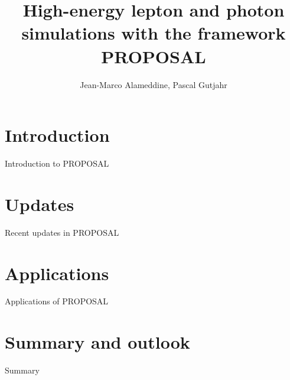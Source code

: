 \documentclass[aspectratio=1610, 9pt]{beamer}
\title{High-energy lepton and photon simulations with the framework PROPOSAL}
\author[jean-marco.alameddine@tu-dortmund.de]{Jean-Marco Alameddine, Pascal Gutjahr}
\institute[]{Astroparticle Physics WG Rhode - TU Dortmund University}
\date[]{}
\begin{document}

\maketitle

\section{Introduction}

\begin{frame}
  \begin{center}
    \Huge Introduction to PROPOSAL
  \end{center}
\end{frame}



\section{Updates}

\begin{frame}
  \begin{center}
    \Huge Recent updates in PROPOSAL
  \end{center}
\end{frame}



\section{Applications}

\begin{frame}
  \begin{center}
    \Huge Applications of PROPOSAL
  \end{center}
\end{frame}



\section{Summary and outlook}

\begin{frame}
  \begin{center}
    \Huge Summary
  \end{center}
\end{frame}


\end{document}
